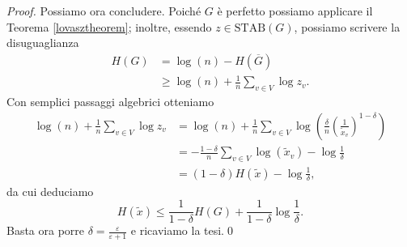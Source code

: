 \begin{proof}
  Possiamo ora concludere. Poiché \(G\) è perfetto possiamo applicare il Teorema \ref{lovasztheorem}; inoltre, essendo \(z\in\text{STAB}(G)\), possiamo scrivere la disuguaglianza 
  \begin{align}
    H(G)&=\log(n)-H(\overline{G}) \nonumber \\
    &\ge \log(n) + \frac{1}{n}\sum_{v\in V}{\log{z_v}}.\nonumber 
  \end{align}
  Con semplici passaggi algebrici otteniamo 
  \begin{align}
    \log(n) + \frac{1}{n}\sum_{v\in V}{\log{z_v}} &= \log(n) + \frac{1}{n}\sum_{v\in V}{\log\left(\frac{\delta}{n}\left(\frac{1}{\tilde{x}_v}\right)^{1-\delta}\right)} \nonumber \\
    &= - \frac{1-\delta}{n}\sum_{v\in V}{\log(\tilde{x}_v)}-\log{\frac{1}{\delta}} \nonumber \\
    &= (1-\delta)H(\tilde{x})-\log{\frac{1}{\delta}} \nonumber, 
  \end{align}
  da cui deduciamo
  \[H(\tilde{x})\le\frac{1}{1-\delta}H(G)+\frac{1}{1-\delta}\log{\frac{1}{\delta}}.\]
  Basta ora porre \(\delta=\frac{\varepsilon}{\varepsilon+1}\) e ricaviamo la tesi.\qed
\end{proof}
